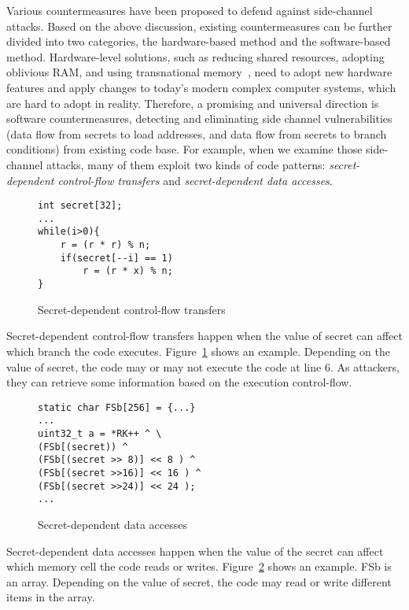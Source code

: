 Various countermeasures have been proposed to defend against side-channel attacks. Based on the above discussion, existing countermeasures can be further divided into two categories, the hardware-based method and the software-based method. Hardware-level solutions, such as reducing shared resources, adopting oblivious RAM, and using transnational memory~\cite{203878,217537,shih2017t,Zhang:2015:HDL:2775054.2694372}, need to adopt new hardware features and apply changes to today's modern complex computer systems, which are hard to adopt in reality. Therefore, a promising and universal direction is software countermeasures, detecting and eliminating side channel vulnerabilities (data flow from secrets to load addresses, and data flow from secrets to branch conditions) from existing code base. For example, when we examine those side-channel attacks, many of them exploit two kinds of code patterns: \emph{secret-dependent control-flow transfers} and \emph{secret-dependent data accesses}.
\begin{figure}[h]
    \begin{lstlisting}[xleftmargin=.32\textwidth, xrightmargin=.32\textwidth]
int secret[32];
...
while(i>0){
    r = (r * r) % n;
    if(secret[--i] == 1)
        r = (r * x) % n;   
}
\end{lstlisting}
    \caption{Secret-dependent control-flow transfers}
    \label{fig:secret:cf}
\end{figure}

Secret-dependent control-flow transfers happen when the value of secret can affect which branch the code executes. Figure~\ref{fig:secret:cf} shows an example. Depending on the value of \textsf{secret}, the code may or may not execute the code at line 6. As attackers, they can retrieve some information based on the execution control-flow.

\begin{figure}[h]
    \begin{lstlisting}[xleftmargin=.32\textwidth, xrightmargin=.32\textwidth]
static char FSb[256] = {...}
... 
uint32_t a = *RK++ ^ \ 
(FSb[(secret)) ^
(FSb[(secret >> 8)] << 8 ) ^
(FSb[(secret >>16)] << 16 ) ^
(FSb[(secret >>24)] << 24 );
...
\end{lstlisting}
    \caption{Secret-dependent data accesses}
    \label{fig:secret:da}
\end{figure}

Secret-dependent data accesses happen when the value of the secret can affect which memory cell the code reads or writes. Figure~\ref{fig:secret:da} shows an example. \textsf{FSb} is an array. Depending on the value of \textsf{secret}, the code may read or write different items in the array.

